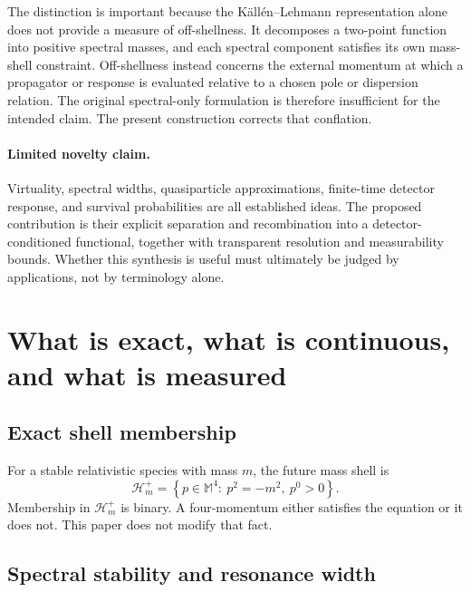 \documentclass[11pt]{article}
\theoremstyle{remark}
\newcommand{\Mink}{\mathbb M}
\begin{document}
The distinction is important because the K\"all\'en--Lehmann representation alone does not provide a measure of off-shellness. It decomposes a two-point function into positive spectral masses, and each spectral component satisfies its own mass-shell constraint. Off-shellness instead concerns the external momentum at which a propagator or response is evaluated relative to a chosen pole or dispersion relation. The original spectral-only formulation is therefore insufficient for the intended claim. The present construction corrects that conflation.

\paragraph{Limited novelty claim.}
Virtuality, spectral widths, quasiparticle approximations, finite-time detector response, and survival probabilities are all established ideas. The proposed contribution is their explicit separation and recombination into a detector-conditioned functional, together with transparent resolution and measurability bounds. Whether this synthesis is useful must ultimately be judged by applications, not by terminology alone.

\section{What is exact, what is continuous, and what is measured}

\subsection{Exact shell membership}

For a stable relativistic species with mass $m$, the future mass shell is
\begin{equation}
  \mathcal H_m^+
  =\left\{p\in\Mink^4:\ p^2=-m^2,\ p^0>0\right\}.
\end{equation}
Membership in $\mathcal H_m^+$ is binary. A four-momentum either satisfies the equation or it does not. This paper does not modify that fact.

\subsection{Spectral stability and resonance width}
\end{document}
